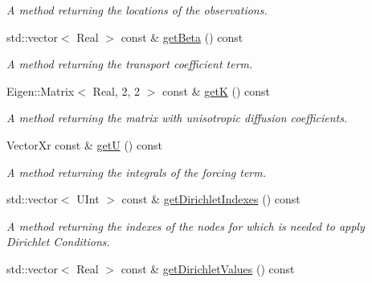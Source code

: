 \begin{DoxyCompactItemize}
\begin{DoxyCompactList}\small\item\em A method returning the locations of the observations. \item\end{DoxyCompactList}\item 
\hypertarget{classIOHandler_a2b018ad9b621214c4ab79149ff69c55b}{
std::vector$<$ Real $>$ const \& \hyperlink{classIOHandler_a2b018ad9b621214c4ab79149ff69c55b}{getBeta} () const }
\label{classIOHandler_a2b018ad9b621214c4ab79149ff69c55b}

\begin{DoxyCompactList}\small\item\em A method returning the transport coefficient term. \item\end{DoxyCompactList}\item 
\hypertarget{classIOHandler_a6f22b7d632d5e0bd5ab8cc5d979b4e9a}{
Eigen::Matrix$<$ Real, 2, 2 $>$ const \& \hyperlink{classIOHandler_a6f22b7d632d5e0bd5ab8cc5d979b4e9a}{getK} () const }
\label{classIOHandler_a6f22b7d632d5e0bd5ab8cc5d979b4e9a}

\begin{DoxyCompactList}\small\item\em A method returning the matrix with unisotropic diffusion coefficients. \item\end{DoxyCompactList}\item 
\hypertarget{classIOHandler_a1f83ec53438b95513a8bce194de0d6db}{
VectorXr const \& \hyperlink{classIOHandler_a1f83ec53438b95513a8bce194de0d6db}{getU} () const }
\label{classIOHandler_a1f83ec53438b95513a8bce194de0d6db}

\begin{DoxyCompactList}\small\item\em A method returning the integrals of the forcing term. \item\end{DoxyCompactList}\item 
\hypertarget{classIOHandler_a9e42ef3bedfb3d4af2b6d8d1b151e94e}{
std::vector$<$ UInt $>$ const \& \hyperlink{classIOHandler_a9e42ef3bedfb3d4af2b6d8d1b151e94e}{getDirichletIndexes} () const }
\label{classIOHandler_a9e42ef3bedfb3d4af2b6d8d1b151e94e}

\begin{DoxyCompactList}\small\item\em A method returning the indexes of the nodes for which is needed to apply Dirichlet Conditions. \item\end{DoxyCompactList}\item 
\hypertarget{classIOHandler_a6939535198d0550bd1b07aac82b6c421}{
std::vector$<$ Real $>$ const \& \hyperlink{classIOHandler_a6939535198d0550bd1b07aac82b6c421}{getDirichletValues} () const }
\label{classIOHandler_a6939535198d0550bd1b07aac82b6c421}


\end{DoxyCompactItemize}
